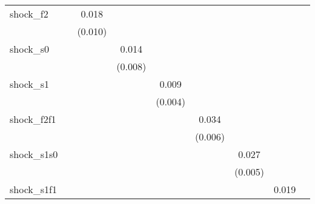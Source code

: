 {\begin{tabular}{l*{8}{c}}
\addlinespace
shock\_f2    &                     &       0.018\sym{*}  &                     &                     &                     &                     &                     &                     \\
            &                     &     (0.010)         &                     &                     &                     &                     &                     &                     \\
\addlinespace
shock\_s0    &                     &                     &       0.014\sym{*}  &                     &                     &                     &                     &                     \\
            &                     &                     &     (0.008)         &                     &                     &                     &                     &                     \\
\addlinespace
shock\_s1    &                     &                     &                     &       0.009\sym{**} &                     &                     &                     &                     \\
            &                     &                     &                     &     (0.004)         &                     &                     &                     &                     \\
\addlinespace
shock\_f2f1  &                     &                     &                     &                     &       0.034\sym{***}&                     &                     &                     \\
            &                     &                     &                     &                     &     (0.006)         &                     &                     &                     \\
\addlinespace
shock\_s1s0  &                     &                     &                     &                     &                     &       0.027\sym{***}&                     &                     \\
            &                     &                     &                     &                     &                     &     (0.005)         &                     &                     \\
\addlinespace
shock\_s1f1  &                     &                     &                     &                     &                     &                     &       0.019\sym{**} &                     \\

\end{tabular}}
